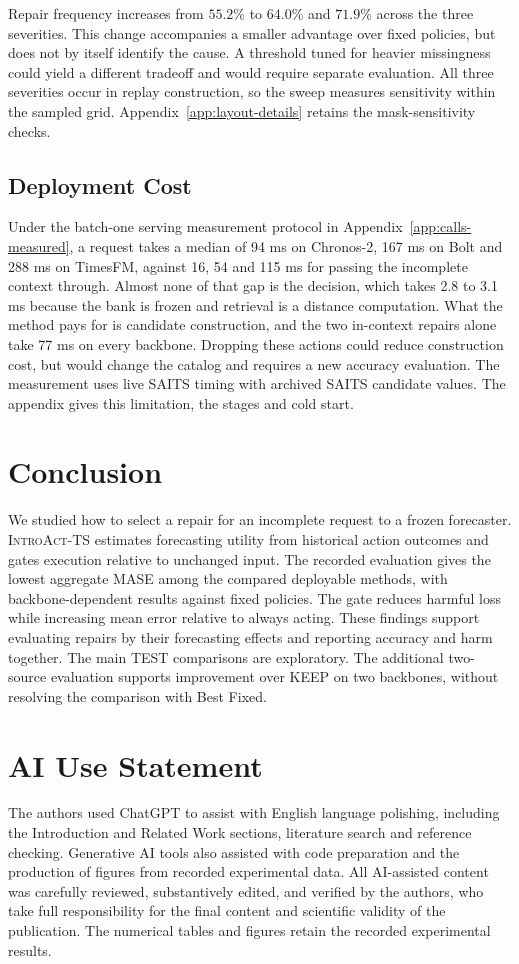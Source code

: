 \documentclass{article}
\newcommand{\introact}{\textsc{IntroAct-TS}}
\begin{document}
Repair frequency increases from $55.2\%$ to $64.0\%$ and $71.9\%$ across the three
severities. This change accompanies a smaller advantage over fixed policies, but does not
by itself identify the cause. A threshold tuned for heavier missingness could yield a
different tradeoff and would require separate evaluation. All three severities occur in
replay construction, so the sweep measures sensitivity within the sampled grid.
Appendix~\ref{app:layout-details} retains the mask-sensitivity checks.

\subsection{Deployment Cost}
\label{sec:exp-cost}
Under the batch-one serving measurement protocol in Appendix~\ref{app:calls-measured},
a request takes a median of 94 ms on
Chronos-2, 167 ms on Bolt and 288 ms on TimesFM, against 16, 54 and 115 ms for passing the
incomplete context through. Almost none of that gap is the decision, which takes 2.8 to
3.1 ms because the bank is frozen and retrieval is a distance computation. What the method
pays for is candidate construction, and the two in-context repairs alone take 77 ms on every
backbone. Dropping these actions could reduce construction cost, but would change the catalog and
requires a new accuracy evaluation. The measurement uses live SAITS timing with archived
SAITS candidate values. The appendix gives this limitation, the stages and cold start.

\section{Conclusion}
\label{sec:conclusion}
We studied how to select a repair for an incomplete request to a frozen forecaster.
\introact{} estimates forecasting utility from historical action outcomes and gates execution
relative to unchanged input. The recorded evaluation gives the lowest aggregate MASE among
the compared deployable methods, with backbone-dependent results against fixed policies.
The gate reduces harmful loss while increasing mean error relative to always acting.
These findings support evaluating repairs by their forecasting effects and reporting accuracy
and harm together. The main TEST comparisons are exploratory. The additional two-source
evaluation supports improvement over KEEP on two backbones, without resolving the comparison
with Best Fixed.
\label{sec:main-end}

\section*{AI Use Statement}
\label{sec:ai-statement}
The authors used ChatGPT to assist with English language polishing, including the
Introduction and Related Work sections, literature search and reference checking.
Generative AI tools also assisted with code preparation and the production of figures
from recorded experimental data. All AI-assisted content was carefully reviewed,
substantively edited, and verified by the authors, who take full responsibility for
the final content and scientific validity of the publication. The numerical tables
and figures retain the recorded experimental results.
\end{document}
